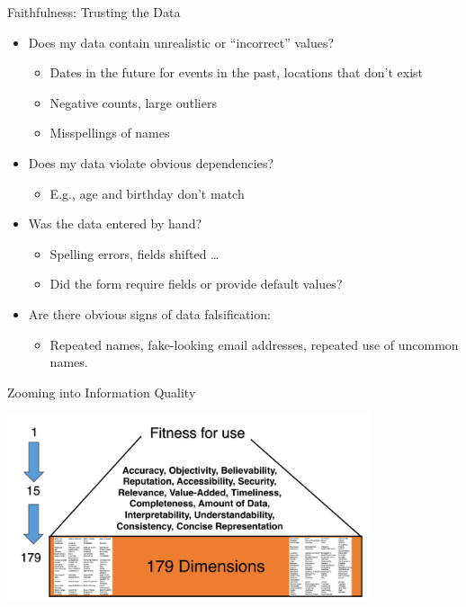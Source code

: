 \documentclass[aspectratio=169]{../latex_main/tntbeamer}  %
\begin{document}
\begin{frame}[c]{Faithfulness: Trusting the Data}
    \begin{itemize}
        \item Does my data contain unrealistic or “incorrect” values?
        \begin{itemize}
            \item Dates in the future for events in the past, locations that don’t exist
            \item Negative counts, large outliers
            \item Misspellings of names
        \end{itemize}
        \item Does my data violate obvious dependencies?
        \begin{itemize}
            \item E.g., age and birthday don’t match
        \end{itemize}
        \item Was the data entered by hand?
        \begin{itemize}
            \item Spelling errors, fields shifted …
            \item Did the form require fields or provide default values?
        \end{itemize}
        \item Are there obvious signs of data falsification:
        \begin{itemize}
            \item Repeated names, fake-looking email addresses, repeated use of uncommon names.
        \end{itemize}
    \end{itemize}
\end{frame}

\begin{frame}[c]{Zooming into Information Quality}

    \centering
    \includegraphics[width=0.8\textwidth]{figure/bild12_information_quality.png}

\end{frame}
\end{document}
